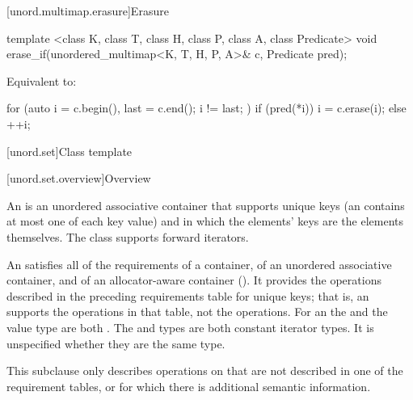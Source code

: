[unord.multimap.erasure]{Erasure}

%
\begin{itemdecl}
template <class K, class T, class H, class P, class A, class Predicate>
  void erase_if(unordered_multimap<K, T, H, P, A>& c, Predicate pred);
\end{itemdecl}

\begin{itemdescr}
\pnum
\effects
Equivalent to:
\begin{codeblock}
for (auto i = c.begin(), last = c.end(); i != last; ) {
  if (pred(*i)) {
    i = c.erase(i);
  } else {
    ++i;
  }
}
\end{codeblock}
\end{itemdescr}

[unord.set]{Class template }%

[unord.set.overview]{Overview}

\pnum
{}%
%
An  is an unordered associative container that
supports unique keys (an  contains at most one of each
key value) and in which the elements' keys are the elements
themselves.
The  class
supports forward iterators.

\pnum
An  satisfies all of the requirements of a container, of an unordered associative container, and of an allocator-aware container (). It provides the operations described in the preceding requirements table for unique keys; that is, an  supports the  operations in that table, not the  operations. For an  the  and the value type are both . The  and  types are both constant iterator types. It is unspecified whether they are the same type.

\pnum
This subclause only describes operations on  that
are not described in one of the requirement tables, or for which there
is additional semantic information.

